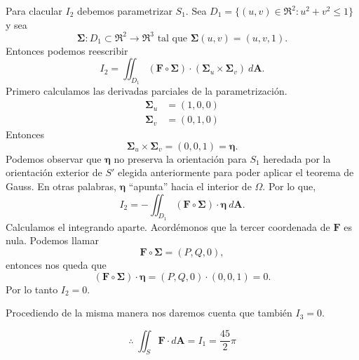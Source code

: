 \begin{solution}
    Para clacular $I_2$  debemos parametrizar $S_1$.  Sea  $D_1=\{(u,v)\in\Re^2:u^2+v^2\leq1\}$ y  sea  $$\boldsymbol{\Sigma}:D_1\subset\Re^2\to\Re^3  \mbox{ tal que }   \boldsymbol{\Sigma}(u,v)=(u,v,1).$$
    Entonces podemos reescribir
    \[
        I_2=\iint _{D_1} (\mathbf{F}\circ\boldsymbol{\Sigma})\cdot
        (\boldsymbol{\Sigma}_u\times\boldsymbol{\Sigma}_v)\:d\mathbf{A}.
    \]
    Primero calculamos las derivadas parciales de la parametrizaci\'on.
    \begin{align*}
        \boldsymbol{\Sigma}_u & =(1,0,0) \\
        \boldsymbol{\Sigma}_v & =(0,1,0)
    \end{align*}
    Entonces
    \[
        \boldsymbol{\Sigma}_u\times\boldsymbol{\Sigma}_v=(0,0,1)=\boldsymbol{\eta}.
    \]
    Podemos observar que $\boldsymbol{\eta}$ no preserva la orientaci\'on  para $S_1$ heredada  por la orientaci\'on exterior de $S'$ elegida anteriormente para poder aplicar el teorema de Gauss. En otras palabras,  $\boldsymbol{\eta}$ ``apunta''  hacia el interior de $\Omega$.  Por lo que,
    \[
        I_2=-\iint _{D_1} (\mathbf{F}\circ\boldsymbol{\Sigma})\cdot \boldsymbol{\eta}\:d\mathbf{A}.
    \]
    Calculamos el integrando aparte. Acord\'emonos que la tercer coordenada de $\mathbf{F}$ es nula. Podemos llamar
    \[
        \mathbf{F}\circ\boldsymbol{\Sigma}=(P,Q,0),
    \]
    entonces nos queda que
    \[
        (\mathbf{F}\circ\boldsymbol{\Sigma})\cdot \boldsymbol{\eta}=(P,Q,0)\cdot (0,0,1)=0.
    \]
    Por lo tanto $I_2=0$.

    Procediendo de la misma manera nos daremos cuenta que tambi\'en $I_3=0$.

    $$\therefore\;\iint _{S} \mathbf{F}\cdot d\mathbf{A}=I_1=\frac{45}{2}\pi$$
\end{solution}


